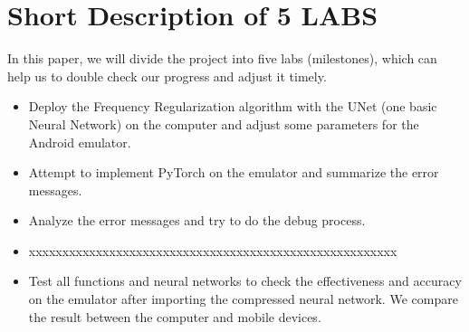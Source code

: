 \documentclass{article}
\newcommand{\chronoperiode}[7]{
	\pgfmathsetmacro{\first}{(#2 - 2023)*12 + #3 - .9} %
	\pgfmathsetmacro{\last}{(#4 - 2023)*12 + #5 - 1.1} %
	\pgfmathsetmacro{\middle}{(\first+\last)/2} %
	
	\fill[#7] (\first,#6-1) rectangle (\last,#6) (\middle,#6-.5) node[white, font=\sf]{#1};
}
\begin{document}

\section*{Short Description of 5 LABS}

In this paper, we will divide the project into five labs (milestones), which can help us to double check our progress and adjust it timely.

\begin{itemize}
	\item Deploy the Frequency Regularization algorithm with the UNet (one basic Neural Network) on the computer and adjust some parameters for the Android emulator. 
	
	\item Attempt to implement PyTorch on the emulator and summarize the error messages.
	
	\item Analyze the error messages and try to do the debug process. 
	
	\item xxxxxxxxxxxxxxxxxxxxxxxxxxxxxxxxxxxxxxxxxxxxxxxxxxxxxxx
	
	\item Test all functions and neural networks to check the effectiveness and accuracy on the emulator after importing the compressed neural network. We compare the result between the computer and mobile devices. 
	
\end{itemize}



\small

% 
  
\end{document}

